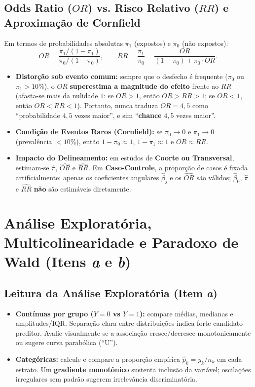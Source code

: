 \documentclass[11pt,a4paper]{article}
\begin{document}
\subsection{Odds Ratio ($OR$) vs. Risco Relativo ($RR$) e Aproximação de Cornfield}
Em termos de probabilidades absolutas $\pi_1$ (expostos) e $\pi_0$ (não expostos):
\[
  OR = \frac{\pi_1 / (1-\pi_1)}{\pi_0 / (1-\pi_0)}, \qquad
  RR = \frac{\pi_1}{\pi_0} = \frac{OR}{(1 - \pi_0) + \pi_0 \cdot OR}.
\]
\begin{itemize}[leftmargin=1.4em]
  \item \textbf{Distorção sob evento comum:} sempre que o desfecho é frequente ($\pi_0$ ou $\pi_1 > 10\%$), o $OR$ \textbf{superestima a magnitude do efeito} frente ao $RR$ (afasta-se mais da nulidade $1$: se $OR > 1$, então $OR > RR > 1$; se $OR < 1$, então $OR < RR < 1$). Portanto, nunca traduza $OR = 4{,}5$ como ``probabilidade $4{,}5$ vezes maior'', e sim ``\textbf{chance} $4{,}5$ vezes maior''.
  \item \textbf{Condição de Eventos Raros (Cornfield):} se $\pi_0 \to 0$ e $\pi_1 \to 0$ (prevalência $< 10\%$), então $1 - \pi_0 \approx 1$, $1 - \pi_1 \approx 1$ e $OR \approx RR$.
  \item \textbf{Impacto do Delineamento:} em estudos de \textbf{Coorte ou Transversal}, estimam-se $\hat{\pi}$, $\widehat{OR}$ e $\widehat{RR}$. Em \textbf{Caso-Controle}, a proporção de casos é fixada artificialmente: apenas os coeficientes angulares $\hat{\beta}_j$ e os $\widehat{OR}$ são válidos; $\hat{\beta}_0$, $\hat{\pi}$ e $\widehat{RR}$ \textbf{não} são estimáveis diretamente.
\end{itemize}

\section{Análise Exploratória, Multicolinearidade e Paradoxo de Wald (Itens \textit{a} e \textit{b})}

\subsection{Leitura da Análise Exploratória (Item \textit{a})}
\begin{itemize}[leftmargin=1.4em]
  \item \textbf{Contínuas por grupo ($Y=0$ vs $Y=1$):} compare médias, medianas e amplitudes/IQR. Separação clara entre distribuições indica forte candidato preditor. Avalie visualmente se a associação cresce/decresce monotonicamente ou sugere curva parabólica (``U'').
  \item \textbf{Categóricas:} calcule e compare a proporção empírica $\hat{p}_k = y_k/n_k$ em cada estrato. Um \textbf{gradiente monotônico} sustenta inclusão da variável; oscilações irregulares sem padrão sugerem irrelevância discriminatória.
\end{itemize}
\end{document}
